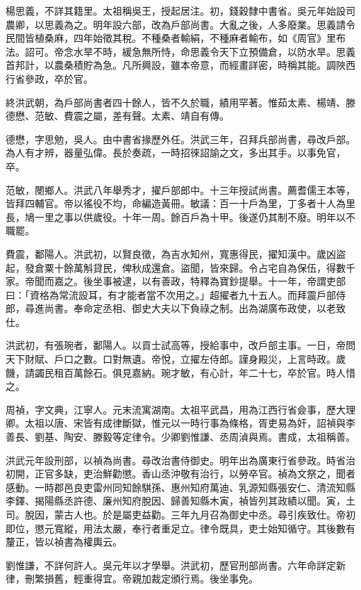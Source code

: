 \begin{pinyinscope}
楊思義，不詳其籍里。太祖稱吳王，授起居注。初，錢穀隸中書省。吳元年始設司農卿，以思義為之。明年設六部，改為戶部尚書。大亂之後，人多廢業。思義請令民間皆植桑麻，四年始徵其稅。不種桑者輸絹，不種麻者輸布，如《周官》里布法。詔可。帝念水旱不時，緩急無所恃，命思義令天下立預備倉，以防水旱。思義首邦計，以農桑積貯為急。凡所興設，雖本帝意，而經畫詳密，時稱其能。調陜西行省參政，卒於官。

終洪武朝，為戶部尚書者四十餘人，皆不久於職，績用罕著。惟茹太素、楊靖、滕德懋、范敏、費震之屬，差有聲。太素、靖自有傳。

德懋，字思勉，吳人。由中書省掾歷外任。洪武三年，召拜兵部尚書，尋改戶部。為人有才辨，器量弘偉。長於奏疏，一時招徠詔諭之文，多出其手。以事免官，卒。

范敏，閿鄉人。洪武八年舉秀才，擢戶部郎中。十三年授試尚書。薦耆儒王本等，皆拜四輔官。帝以徭役不均，命編造黃冊。敏議：百一十戶為里，丁多者十人為里長，鳩一里之事以供歲役。十年一周。餘百戶為十甲。後遂仍其制不廢。明年以不職罷。

費震，鄱陽人。洪武初，以賢良徵，為吉水知州，寬惠得民，擢知漢中。歲凶盜起，發倉粟十餘萬斛貸民，俾秋成還倉。盜聞，皆來歸。令占宅自為保伍，得數千家。帝聞而嘉之。後坐事被逮，以有善政，特釋為寶鈔提舉。十一年，帝謂吏部曰：「資格為常流設耳，有才能者當不次用之。」超擢者九十五人。而拜震戶部侍郎，尋進尚書。奉命定丞相、御史大夫以下負祿之制。出為湖廣布政使，以老致仕。

洪武初，有張琬者，鄱陽人。以貢士試高等，授給事中，改戶部主事。一日，帝問天下財賦、戶口之數。口對無遺。帝悅，立擢左侍郎。謹身殿災，上言時政。歲饑，請蠲民租百萬餘石。俱見嘉納。琬才敏，有心計，年二十七，卒於官。時人惜之。

周禎，字文典，江寧人。元末流寓湖南。太祖平武昌，用為江西行省僉事，歷大理卿。太祖以唐、宋皆有成律斷獄，惟元以一時行事為條格，胥吏易為奸，詔禎與李善長、劉基、陶安、滕毅等定律令。少卿劉惟謙、丞周湞與焉。書成，太祖稱善。

洪武元年設刑部，以禎為尚書。尋改治書侍御史。明年出為廣東行省參政。時省治初開，正官多缺，吏治鮮勸懲。香山丞沖敬有治行，以勞卒官。禎為文祭之，聞者感動。一時郡邑良吏雷州同知餘騏孫、惠州知府萬迪、乳源知縣張安仁、清流知縣李鐸、揭陽縣丞許德、廉州知府脫因、歸善知縣木寅，禎皆列其政績以聞。寅，土司。脫因，蒙古人也。於是屬吏益勸。三年九月召為御史中丞。尋引疾致仕。帝初即位，懲元寬縱，用法太嚴，奉行者重足立。律令既具，吏士始知循守。其後數有釐正，皆以禎書為權輿云。

劉惟謙，不詳何許人。吳元年以才學舉。洪武初，歷官刑部尚書。六年命詳定新律，刪繁損舊，輕重得宜。帝親加裁定頒行焉。後坐事免。


\end{pinyinscope}

